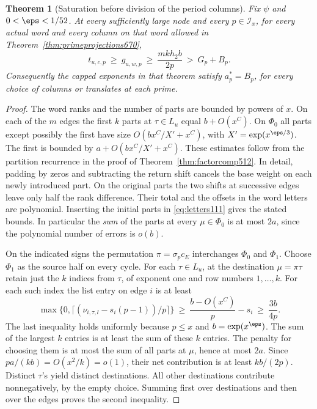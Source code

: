 \documentclass[a4paper,11pt]{article}
\newtheorem{theorem}[proposition]{Theorem}
\theoremstyle{definition}
\theoremstyle{remark}
\numberwithin{equation}{section}
\begin{document}
\begin{theorem}[Saturation before division of the period columns]
\leavevmode\label{thm:rawsaturation672}
Fix \(\psi\) and \(0<\eps<1/52\). At every sufficiently large
node and every \(p\in\mathcal I_x\), for every actual word and
every column on that word allowed in
Theorem~\ref{thm:primeprojections670},
\[
          t_{u,c,p}\ \ge\ g_{u,w,p}\ \ge\
          \frac{m k h_2 b}{2p}\ >\ G_p+B_p .
\]
Consequently the capped exponents in that theorem satisfy
\(a_p^*=B_p\), for every choice of columns or translates at
each prime.
\end{theorem}
\begin{proof}
The word ranks and the number of parts are bounded by powers of
\(x\). On each of the \(m\) edges the first \(k\) parts at
\(\tau\in L_u\) equal \(b+O(x^C)\). On \(\Phi_0\) all parts
except possibly the first have size \(O(bx^C/X'+x^C)\), with
\(X'=\exp(x^{\eps/3})\). The first is bounded by
\(a+O(bx^C/X'+x^C)\). These estimates follow from the partition
recurrence in the proof of Theorem~\ref{thm:factorcomp512}.
In detail, padding by zeros and subtracting the return shift
cancels the base weight on each newly introduced part. On the
original parts the two shifts at successive edges leave only
half the rank difference. Their total and the offsets in the
word letters are polynomial. Inserting the initial parts in
\eqref{eq:letters111} gives the stated bounds. In particular
the \emph{sum} of the parts at every \(\mu\in\Phi_0\) is at
most \(2a\), since the polynomial number of errors is \(o(b)\).

On the indicated signs the permutation \(\pi=\sigma_pc_E\)
interchanges \(\Phi_0\) and \(\Phi_1\). Choose \(\Phi_1\) as
the source half on every cycle. For each \(\tau\in L_u\), at
the destination \(\mu=\pi\tau\) retain just the \(k\) indices
from \(\tau\), of exponent one and row numbers \(1,\ldots,k\).
For each such index the list entry on edge \(i\) is at least
\[
 \max\{0,\lceil(\nu_{i,\tau,l}-s_i(p-1))/p\rceil\}
         \ \ge\ \frac{b-O(x^C)}p-s_i
         \ \ge\ \frac{3b}{4p}.
\]
The last inequality holds uniformly because \(p\le x\) and
\(b=\exp(x^\eps)\). The sum of the largest \(k\) entries is
at least the sum of these \(k\) entries. The penalty for choosing
them is at most the sum of all parts at \(\mu\), hence at most
\(2a\). Since \(pa/(kb)=O(x^2/k)=o(1)\), their net contribution
is at least \(kb/(2p)\). Distinct \(\tau\)'s yield distinct
destinations. All other destinations contribute nonnegatively,
by the empty choice. Summing first over destinations and then
over the edges proves the second inequality.


\end{proof}
\end{document}
